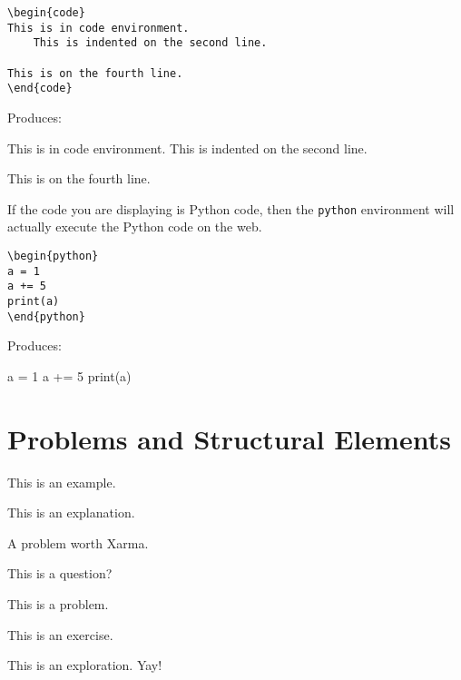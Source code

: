 \documentclass{ximera}
\begin{document}
\begin{verbatim}
\begin{code}
This is in code environment.
    This is indented on the second line.

This is on the fourth line.
\end{code}
\end{verbatim}

Produces:

\begin{code}
This is in code environment.
    This is indented on the second line.

This is on the fourth line.
\end{code}

If the code you are displaying is Python code, then the \verb!python! environment will actually execute the Python code on the web.

\begin{verbatim}
\begin{python}
a = 1
a += 5
print(a)
\end{python}
\end{verbatim}

Produces:

\begin{python}
a = 1
a += 5
print(a)
\end{python}


\section{Problems and Structural Elements}

\begin{example}
This is an example.
\end{example}
\begin{explanation}
This is an explanation.
\end{explanation}
\begin{xarmaBoost}
A problem worth Xarma.
\end{xarmaBoost}
\begin{question}
This is a question?
\end{question}
\begin{problem}
This is a problem.
\end{problem}
\begin{exercise}
This is an exercise.
\end{exercise}
\begin{exploration}
This is an exploration. Yay!
\end{exploration}
\end{document}
